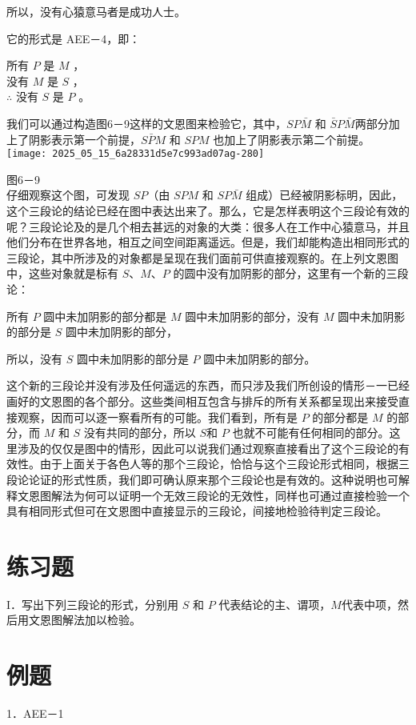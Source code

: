 所以，没有心猿意马者是成功人士。

它的形式是 AEE－4，即：

所有 $P$ 是 $M$ ，\\
没有 $M$ 是 $S$ ，\\
$\therefore$ 没有 $S$ 是 $P$ 。

我们可以通过构造图6－9这样的文恩图来检验它，其中，$S P \bar{M}$ 和 $\bar{S} P \bar{M}$两部分加上了阴影表示第一个前提，$S \bar{P} M$ 和 $S P M$ 也加上了阴影表示第二个前提。\\
\texttt{[image: 2025\_05\_15\_6a28331d5e7c993ad07ag-280]}

图6－9\\
仔细观察这个图，可发现 $S P$（由 $S P M$ 和 $S P \bar{M}$ 组成）已经被阴影标明，因此，这个三段论的结论已经在图中表达出来了。那么，它是怎样表明这个三段论有效的呢？三段论论及的是几个相去甚远的对象的大类：很多人在工作中心猿意马，并且他们分布在世界各地，相互之间空间距离遥远。但是，我们却能构造出相同形式的三段论，其中所涉及的对象都是呈现在我们面前可供直接观察的。在上列文恩图中，这些对象就是标有 $S 、 M 、 P$ 的圆中没有加阴影的部分，这里有一个新的三段论：

所有 $P$ 圆中未加阴影的部分都是 $M$ 圆中未加阴影的部分，没有 $M$ 圆中未加阴影的部分是 $S$ 圆中未加阴影的部分，

所以，没有 $S$ 圆中未加阴影的部分是 $P$ 圆中未加阴影的部分。

这个新的三段论并没有涉及任何遥远的东西，而只涉及我们所创设的情形－一已经画好的文恩图的各个部分。这些类间相互包含与排斥的所有关系都呈现出来接受直接观察，因而可以逐一察看所有的可能。我们看到，所有是 $P$ 的部分都是 $M$ 的部分，而 $M$ 和 $S$ 没有共同的部分，所以 $S$和 $P$ 也就不可能有任何相同的部分。这里涉及的仅仅是图中的情形，因此可以说我们通过观察直接看出了这个三段论的有效性。由于上面关于各色人等的那个三段论，恰恰与这个三段论形式相同，根据三段论论证的形式性质，我们即可确认原来那个三段论也是有效的。这种说明也可解释文恩图解法为何可以证明一个无效三段论的无效性，同样也可通过直接检验一个具有相同形式但可在文恩图中直接显示的三段论，间接地检验待判定三段论。

\section*{练习题}
I．写出下列三段论的形式，分别用 $S$ 和 $P$ 代表结论的主、谓项，$M$代表中项，然后用文恩图解法加以检验。

\section*{例题}
1．AEE－1

